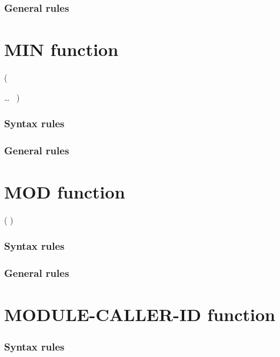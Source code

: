\subsubsection{General rules}

\section{MIN function}

\begin{syntax}
    (
  \begin{1=}
    \argument
  \end{1=}\ldots
  \ {})
\end{syntax}

\subsubsection{Syntax rules}

\subsubsection{General rules}

\section{MOD function}

\begin{syntax}
    ( \argument \argument )
\end{syntax}

\subsubsection{Syntax rules}

\subsubsection{General rules}

\section{MODULE-CALLER-ID function}

\begin{syntax}[\gnucobolcolour]
   
\end{syntax}

\subsubsection{Syntax rules}

